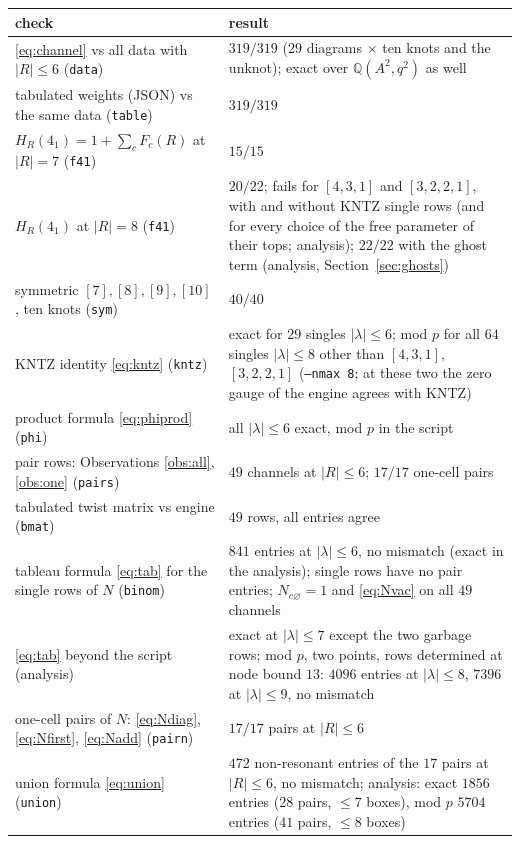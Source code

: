 \documentclass[11pt]{article}
\newcommand{\vac}{\varnothing}
\newcommand{\LMPH}[1]{\texttt{#1}}
\begin{document}
\begin{longtable}{p{}p{}}
\toprule
check & result\\
\midrule
\endhead
\eqref{eq:channel} vs all data with $|R|\le6$ (\LMPH{data}) & $319/319$ ($29$ diagrams $\times$ ten knots and the unknot); exact over $\mathbb Q(A^2,q^2)$ as well\\
tabulated weights (JSON) vs the same data (\LMPH{table}) & $319/319$\\
$H_R(4_1)=1+\sum_cF_c(R)$ at $|R|=7$ (\LMPH{f41}) & $15/15$\\
$H_R(4_1)$ at $|R|=8$ (\LMPH{f41}) & $20/22$; fails for $[4,3,1]$ and $[3,2,2,1]$, with and without KNTZ single rows (and for every choice of the free parameter of their tops; analysis); $22/22$ with the ghost term (analysis, Section~\ref{sec:ghosts})\\
symmetric $[7],[8],[9],[10]$, ten knots (\LMPH{sym}) & $40/40$\\
KNTZ identity \eqref{eq:kntz} (\LMPH{kntz}) & exact for $29$ singles $|\lambda|\le6$; mod $p$ for all $64$ singles $|\lambda|\le8$ other than $[4,3,1]$, $[3,2,2,1]$ (\LMPH{--nmax 8}; at these two the zero gauge of the engine agrees with KNTZ)\\
product formula \eqref{eq:phiprod} (\LMPH{phi}) & all $|\lambda|\le6$ exact, mod $p$ in the script\\
pair rows: Observations \ref{obs:all}, \ref{obs:one} (\LMPH{pairs}) & $49$ channels at $|R|\le6$; $17/17$ one-cell pairs\\
tabulated twist matrix vs engine (\LMPH{bmat}) & $49$ rows, all entries agree\\
tableau formula \eqref{eq:tab} for the single rows of $N$ (\LMPH{binom}) & $841$ entries at $|\lambda|\le6$, no mismatch (exact in the analysis); single rows have no pair entries; $N_{c\vac}=1$ and \eqref{eq:Nvac} on all $49$ channels\\
\eqref{eq:tab} beyond the script (analysis) & exact at $|\lambda|\le7$ except the two garbage rows; mod $p$, two points, rows determined at node bound $13$: $4096$ entries at $|\lambda|\le8$, $7396$ at $|\lambda|\le9$, no mismatch\\
one-cell pairs of $N$: \eqref{eq:Ndiag}, \eqref{eq:Nfirst}, \eqref{eq:Nadd} (\LMPH{pairn}) & $17/17$ pairs at $|R|\le6$\\
union formula \eqref{eq:union} (\LMPH{union}) & $472$ non-resonant entries of the $17$ pairs at $|R|\le6$, no mismatch; analysis: exact $1856$ entries ($28$ pairs, $\le7$ boxes), mod $p$ $5704$ entries ($41$ pairs, $\le8$ boxes)\\

\end{longtable}
\end{document}
